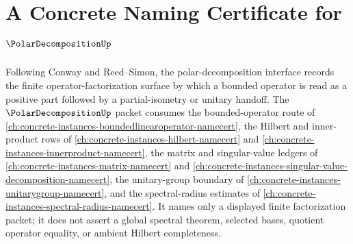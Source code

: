 \chapter{A Concrete Naming Certificate for $\PolarDecompositionUp$}
\label{ch:concrete-instances-polar-decomposition-namecert}

Following Conway and Reed--Simon, the polar-decomposition interface records the finite operator-factorization surface by which a bounded operator is read as a positive part followed by a partial-isometry or unitary handoff. The $\PolarDecompositionUp$ packet consumes the bounded-operator route of \autoref{ch:concrete-instances-boundedlinearoperator-namecert}, the Hilbert and inner-product rows of \autoref{ch:concrete-instances-hilbert-namecert} and \autoref{ch:concrete-instances-innerproduct-namecert}, the matrix and singular-value ledgers of \autoref{ch:concrete-instances-matrix-namecert} and \autoref{ch:concrete-instances-singular-value-decomposition-namecert}, the unitary-group boundary of \autoref{ch:concrete-instances-unitarygroup-namecert}, and the spectral-radius estimates of \autoref{ch:concrete-instances-spectral-radius-namecert}. It names only a displayed finite factorization packet; it does not assert a global spectral theorem, selected bases, quotient operator equality, or ambient Hilbert completeness.

